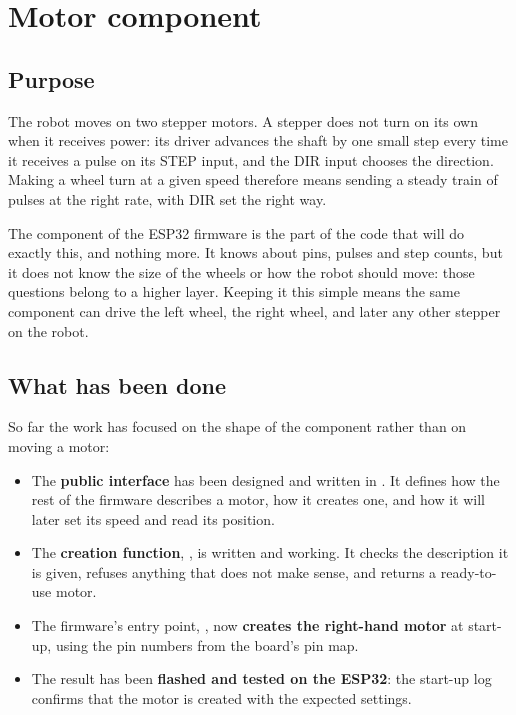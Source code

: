 \chapter{Motor component}\label{ch:motor}

\section{Purpose}
The robot moves on two stepper motors. A stepper does not turn on its own when it receives power: its driver advances the shaft by one small step every time it receives a pulse on its STEP input, and the DIR input chooses the direction. Making a wheel turn at a given speed therefore means sending a steady train of pulses at the right rate, with DIR set the right way.

The  component of the ESP32 firmware is the part of the code that will do exactly this, and nothing more. It knows about pins, pulses and step counts, but it does not know the size of the wheels or how the robot should move: those questions belong to a higher layer. Keeping it this simple means the same component can drive the left wheel, the right wheel, and later any other stepper on the robot.

\section{What has been done}
So far the work has focused on the shape of the component rather than on moving a motor:

\begin{itemize}
  \item The \textbf{public interface} has been designed and written in . It defines how the rest of the firmware describes a motor, how it creates one, and how it will later set its speed and read its position.
  \item The \textbf{creation function}, , is written and working. It checks the description it is given, refuses anything that does not make sense, and returns a ready-to-use motor.
  \item The firmware's entry point, , now \textbf{creates the right-hand motor} at start-up, using the pin numbers from the board's pin map.
  \item The result has been \textbf{flashed and tested on the ESP32}: the start-up log confirms that the motor is created with the expected settings.
\end{itemize}

